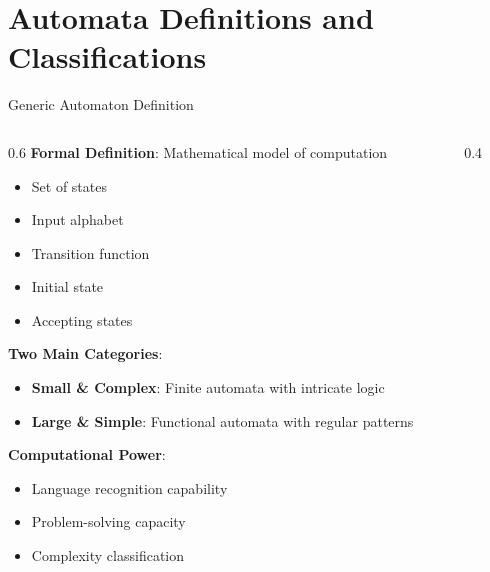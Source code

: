\documentclass[aspectratio=169,11pt]{beamer}
\newcommand{\concept}[1]{\textbf{\color{accentcolor}#1}}
\begin{document}
\section{Automata Definitions and Classifications}
\begin{frame}{Generic Automaton Definition}
\begin{columns}
\begin{column}{0.6\textwidth}
\concept{Formal Definition}: Mathematical model of computation
\begin{itemize}
\item Set of states
\item Input alphabet
\item Transition function
\item Initial state
\item Accepting states
\end{itemize}
\vspace{0.3cm}
\concept{Two Main Categories}:
\begin{itemize}
\item \textbf{Small \& Complex}: Finite automata with intricate logic
\item \textbf{Large \& Simple}: Functional automata with regular patterns
\end{itemize}
\vspace{0.3cm}
\concept{Computational Power}:
\begin{itemize}
\item Language recognition capability
\item Problem-solving capacity
\item Complexity classification
\end{itemize}
\end{column}
\begin{column}{0.4\textwidth}
\begin{center}

\end{center}
\end{column}
\end{columns}
\end{frame}
\end{document}
